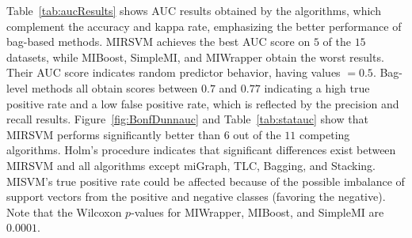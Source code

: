 \documentclass[reqno]{vcuthesis}
\numberwithin{equation}{chapter}
\begin{document}
\begin{table}[b!]
{}\vspace{-1.8em}
\label{fig:BonfDunnauc}\vspace{-1.3em}
\label{tab:statauc}
\scriptsize
{}
\end{table}
Table~\ref{tab:aucResults} shows AUC results obtained by the algorithms, which complement the accuracy and kappa rate, emphasizing the better performance of bag-based methods. MIRSVM achieves the best AUC score on $5$ of the $15$ datasets, while MIBoost, SimpleMI, and MIWrapper obtain the worst results. Their AUC score indicates random predictor behavior, having values $= 0.5$. Bag-level methods all obtain scores between $0.7$ and $0.77$ indicating a high true positive rate and a low false positive rate, which is reflected by the precision and recall results. Figure~\ref{fig:BonfDunnauc} and Table~\ref{tab:statauc} show that MIRSVM performs significantly better than $6$ out of the $11$ competing algorithms. Holm's procedure indicates that significant differences exist between MIRSVM and all algorithms except miGraph, TLC, Bagging, and Stacking. MISVM's true positive rate could be affected because of the possible imbalance of support vectors from the positive and negative classes (favoring the negative). Note that the Wilcoxon $p$-values for MIWrapper, MIBoost, and SimpleMI are $0.0001$. 
\end{document}
